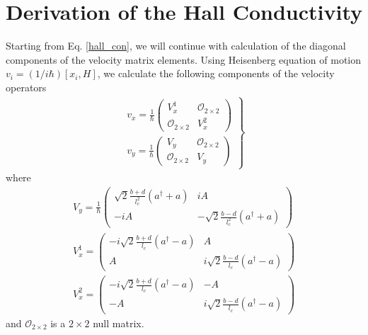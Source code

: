\documentclass[prb,twocolumn]{revtex4-1}
\begin{document}
\section{Derivation of the Hall Conductivity}\label{AppB}
Starting from Eq. \ref{hall_con}, we will continue with calculation of the diagonal components of the velocity matrix elements. Using Heisenberg equation of motion $v_i = (1/i\hbar)[x_i,H]$, we calculate the
following components of the velocity operators
\begin{eqnarray}\label{vell}
\left.
\begin{array}{ll}
v_x=\frac{1}{\hbar}\begin{pmatrix}
V_x^1 & \mathcal{O}_{2\times 2}\\
\mathcal{O}_{2\times 2} &V_x^2
\end{pmatrix}
\\
v_y=\frac{1}{\hbar}\begin{pmatrix}
V_y & \mathcal{O}_{2\times 2}\\
\mathcal{O}_{2\times 2} &V_y
\end{pmatrix}
\end{array}
\right\}
\end{eqnarray}
where 
\begin{eqnarray*}
V_y=\frac{1}{\hbar}\begin{pmatrix}
\sqrt{2}\frac{b+d}{l_c^2}(a^\dagger+a) & i A\\
-i A & -\sqrt{2}\frac{b-d}{l_c^2}(a^\dagger+a)
\end{pmatrix}\\
V_x^1=
\begin{pmatrix}
	-i\sqrt{2}\frac{b+d}{l_c}(a^\dagger-a) & A\\
	A & i\sqrt{2}\frac{b-d}{l_c}(a^\dagger-a)
\end{pmatrix}\\
V_x^2=
\begin{pmatrix}
		-i\sqrt{2}\frac{b+d}{l_c}(a^\dagger-a) & -A\\
		-A & i\sqrt{2}\frac{b-d}{l_c}(a^\dagger-a)
	\end{pmatrix}
\end{eqnarray*}
and $\mathcal{O}_{2\times 2}$ is a $2\times 2$ null matrix.
\end{document}
